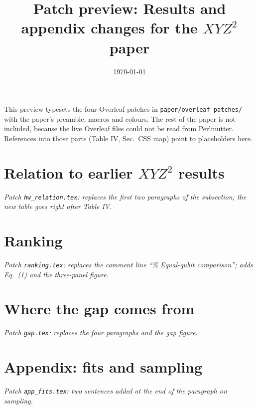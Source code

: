\documentclass[aps,prx,twocolumn,superscriptaddress,nofootinbib,floatfix,longbibliography]{revtex4-2}
\makeatletter
\newcommand{\fakelabel}[2]{\def\@currentlabel{#2}\phantomsection\label{#1}}
\newcommand{\XYZ}{\ensuremath{XYZ^2}}
\makeatother
\begin{document}
\title{Patch preview: Results and appendix changes for the \XYZ{} paper}
\date{\today}
\maketitle

\noindent This preview typesets the four Overleaf patches in \texttt{paper/overleaf\_patches/} with the paper's preamble, macros and colours. The rest of the paper is not included, because the live Overleaf files could not be read from Perlmutter. References into those parts (Table IV, Sec.~CSS map) point to placeholders here.
\fakelabel{tab:hw}{IV}\fakelabel{sec:cssmap}{[CSS map]}

\section{Relation to earlier \XYZ{} results}
\noindent\emph{Patch \texttt{hw\_relation.tex}: replaces the first two paragraphs of the subsection; the new table goes right after Table IV.}\par\medskip


\section{Ranking}\label{sec:ranking}
\noindent\emph{Patch \texttt{ranking.tex}: replaces the comment line ``\% Equal-qubit comparison''; adds Eq.~(1) and the three-panel figure.}\par\medskip


\section{Where the gap comes from}
\noindent\emph{Patch \texttt{gap.tex}: replaces the four paragraphs and the gap figure.}\par\medskip


\section{Appendix: fits and sampling}
\noindent\emph{Patch \texttt{app\_fits.tex}: two sentences added at the end of the paragraph on sampling.}\par\medskip



\end{document}
